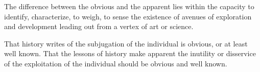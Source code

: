 

The difference between the obvious and the apparent lies within the
capacity to identify, characterize, to weigh, to sense the existence
of avenues of exploration and development leading out from a vertex of
art or science.

That history writes of the subjugation of the individual is obvious,
or at least well known.  That the lessons of history make apparent the
inutility or disservice of the exploitation of the individual should
be obvious and well known.

\bye

